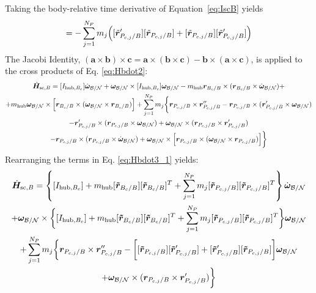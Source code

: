 Taking the body-relative time derivative of Equation~\eqref{eq:IscB} yields
\begin{equation}
	[I'_{\text{sc},B}] = - \sum\limits_{j=1}^{N_P} m_j \Bigl(  [\tilde{\bm{r}}'_{P_{c,j}/B}] [\tilde{\bm{r}}_{P_{c,j}/B}] + [\tilde{\bm{r}}_{P_{c,j}/B}] [\tilde{\bm{r}}'_{P_{c,j}/B}]  \Bigr)
	\label{eq:Idotsc}
\end{equation}
The Jacobi Identity, $(\bm a \times \bm b)\times \bm c = \bm a \times (\bm b\times \bm c) - \bm        b \times (\bm a\times \bm c)$, is applied to the cross products of Eq. \eqref{eq:Hbdot2}:
\begin{multline}
	\dot{\bm{H}}_{\text{sc},B} = [I_{\text{hub},B_c}] \dot{\bm\omega}_{\cal B/N} + \bm\omega_{\cal B/N} \times [I_{\text{hub},B_c}] \bm\omega_{\cal B/N} - m_{\text{hub}} \bm{r}_{B_c/B}\times (\bm{r}_{B_c/B}\times \dot{\bm\omega}_{\cal B/N})+\\ +m_{\text{hub}}  \bm\omega_{\cal B/N}\times \Bigl[\bm{r}_{B_c/B}\times(\bm\omega_{\cal B/N}\times \bm{r}_{B_c/B})\Bigr] + \sum\limits_{j=1}^{N_P}m_j \bigg\{ \bm r_{P_{c,j}/B}\times \bm{r}''_{P_{c,j}/B} -\bm r_{P_{c,j}/B}\times (\bm{r}'_{P_{c,j}/B}\times\bm\omega_{\cal B/N} )\\-
	\bm{r}'_{P_{c,j}/B}\times (\bm r_{P_{c,j}/B}\times\bm\omega_{\cal B/N})+\bm\omega_{\cal B/N}\times(\bm r_{P_{c,j}/B}\times\bm{r}'_{P_{c,j}/B})
	\\ - \bm r_{P_{c,j}/B}\times (\bm{r}_{P_{c,j}/B} \times \dot{\bm\omega}_{\cal B/N}) +\bm\omega_{\cal B/N} \times \Bigl[\bm r_{P_{c,j}/B}\times (\bm\omega_{\cal B/N} \times \bm{r}_{P_{c,j}/B})\Bigl]\bigg\}
	\label{eq:Hbdot3_1}
\end{multline}
Rearranging the terms in Eq. \eqref{eq:Hbdot3_1} yields:
\begin{multline}
	\dot{\bm{H}}_{\text{sc},B} = \left\{[I_{\text{hub},B_c}] +m_{\text{hub}} [\bm{\tilde{r}}_{B_c/B}] [\bm{\tilde{r}}_{B_c/B}]^T+\sum\limits_{j=1}^{N_P}m_j [\bm{\tilde{r}}_{P_{c,j}/B}][\bm{\tilde{r}}_{P_{c,j}/B}]^T \right\} \dot{\bm\omega}_{\cal B/N} \\
	+ \bm\omega_{\cal B/N} \times \bigg \{[I_{\text{hub},B_c}] + m_{\text{hub}} [\bm{\tilde{r}}_{B_c/B}] [\bm{\tilde{r}}_{B_c/B}]^T +\sum\limits_{j=1}^{N_P}m_j [\bm{\tilde{r}}_{P_{c,j}/B}][\bm{\tilde{r}}_{P_{c,j}/B}]^T \bigg\}\bm\omega_{\cal B/N} \\ + \sum\limits_{j=1}^{N_P}m_j \bigg\{ \bm r_{P_{c,j}/B}\times \bm{r}''_{P_{c,j}/B} -\bigg[[\bm{\tilde{r}}_{P_{c,j}/B}][\bm{\tilde{r}}'_{P_{c,j}/B}]+[\bm{\tilde{r}}'_{P_{c,j}/B}][\bm{\tilde{r}}_{P_{c,j}/B}] \bigg]\bm\omega_{\cal B/N}\\
	+\bm\omega_{\cal B/N}\times(\bm r_{P_{c,j}/B}\times\bm{r}'_{P_{c,j}/B}) \bigg\}
	\label{eq:Hbdot3_2}
\end{multline}
